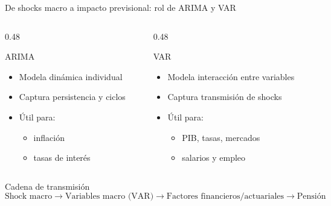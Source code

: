 \documentclass[10pt,aspectratio=169]{beamer}
\begin{document}
\begin{frame}{De shocks macro a impacto previsional: rol de ARIMA y VAR}


\begin{columns}[T]

\begin{column}{0.48\textwidth}
\begin{block}{ARIMA}
\begin{itemize}
    \item Modela dinámica individual
    \item Captura persistencia y ciclos
    \item Útil para:
    \begin{itemize}
        \item inflación
        \item tasas de interés
    \end{itemize}
\end{itemize}
\end{block}
\end{column}

\begin{column}{0.48\textwidth}
\begin{block}{VAR}
\begin{itemize}
    \item Modela interacción entre variables
    \item Captura transmisión de shocks
    \item Útil para:
    \begin{itemize}
        \item PIB, tasas, mercados
        \item salarios y empleo
    \end{itemize}
\end{itemize}
\end{block}
\end{column}

\end{columns}

\vspace{0.3cm}

\begin{exampleblock}{Cadena de transmisión}
\[
\text{Shock macro} \rightarrow \text{Variables macro (VAR)} \rightarrow \text{Factores financieros/actuariales} \rightarrow \text{Pensión}
\]
\end{exampleblock}

\end{frame}
\end{document}
